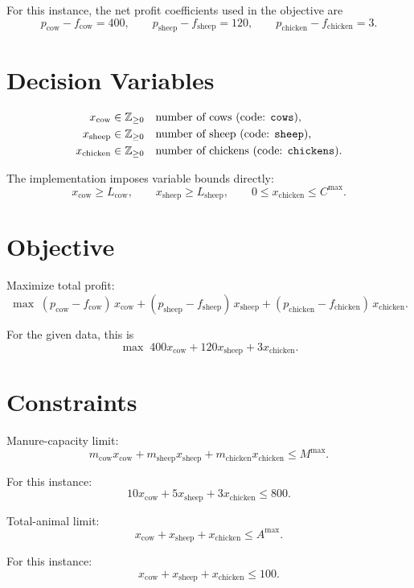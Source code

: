 For this instance, the net profit coefficients used in the objective are
\[
p_{\mathrm{cow}}-f_{\mathrm{cow}}=400,\qquad
p_{\mathrm{sheep}}-f_{\mathrm{sheep}}=120,\qquad
p_{\mathrm{chicken}}-f_{\mathrm{chicken}}=3.
\]

\section*{Decision Variables}

\begin{align*}
x_{\mathrm{cow}} &\in \mathbb{Z}_{\ge 0} && \text{number of cows (code: \texttt{cows})},\\
x_{\mathrm{sheep}} &\in \mathbb{Z}_{\ge 0} && \text{number of sheep (code: \texttt{sheep})},\\
x_{\mathrm{chicken}} &\in \mathbb{Z}_{\ge 0} && \text{number of chickens (code: \texttt{chickens})}.
\end{align*}

The implementation imposes variable bounds directly:
\[
x_{\mathrm{cow}} \ge L_{\mathrm{cow}},\qquad
x_{\mathrm{sheep}} \ge L_{\mathrm{sheep}},\qquad
0 \le x_{\mathrm{chicken}} \le C^{\max}.
\]

\section*{Objective}

Maximize total profit:
\[
\max \;
(p_{\mathrm{cow}}-f_{\mathrm{cow}})\,x_{\mathrm{cow}}
+ (p_{\mathrm{sheep}}-f_{\mathrm{sheep}})\,x_{\mathrm{sheep}}
+ (p_{\mathrm{chicken}}-f_{\mathrm{chicken}})\,x_{\mathrm{chicken}}.
\]

For the given data, this is
\[
\max \; 400x_{\mathrm{cow}} + 120x_{\mathrm{sheep}} + 3x_{\mathrm{chicken}}.
\]

\section*{Constraints}

Manure-capacity limit:
\[
m_{\mathrm{cow}}x_{\mathrm{cow}}
+ m_{\mathrm{sheep}}x_{\mathrm{sheep}}
+ m_{\mathrm{chicken}}x_{\mathrm{chicken}}
\le M^{\max}.
\]

For this instance:
\[
10x_{\mathrm{cow}} + 5x_{\mathrm{sheep}} + 3x_{\mathrm{chicken}} \le 800.
\]

Total-animal limit:
\[
x_{\mathrm{cow}} + x_{\mathrm{sheep}} + x_{\mathrm{chicken}} \le A^{\max}.
\]

For this instance:
\[
x_{\mathrm{cow}} + x_{\mathrm{sheep}} + x_{\mathrm{chicken}} \le 100.
\]

